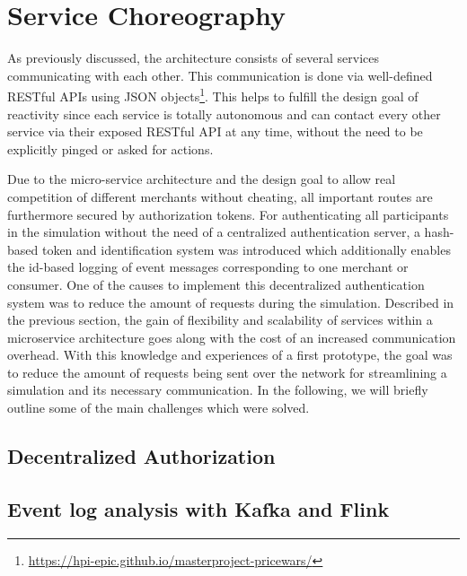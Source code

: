 %
\section{Service Choreography}
\label{sec:Choreography}
%
As previously discussed, the architecture consists of several services communicating with each other. This communication is done via well-defined RESTful APIs using JSON objects\footnote{\url{https://hpi-epic.github.io/masterproject-pricewars/}}. This helps to fulfill the design goal of reactivity since each service is totally autonomous and can contact every other service via their exposed RESTful API at any time, without the need to be explicitly pinged or asked for actions. 

Due to the micro-service architecture and the design goal to allow real competition of different merchants without cheating, all important routes are furthermore secured by authorization tokens. For authenticating all participants in the simulation without the need of a centralized authentication server, a hash-based token and identification system was introduced which additionally enables the id-based logging of event messages corresponding to one merchant or consumer. One of the causes to implement this decentralized authentication system was to reduce the amount of requests during the simulation. Described in the previous section, the gain of flexibility and scalability of services within a microservice architecture goes along with the cost of an increased communication overhead. With this knowledge and experiences of a first prototype, the goal was to reduce the amount of requests being sent over the network for streamlining a simulation and its necessary communication. 
In the following, we will briefly outline some of the main challenges which were solved.

%
\subsection{Decentralized Authorization}
%

%
\subsection{Event log analysis with Kafka and Flink}
%


